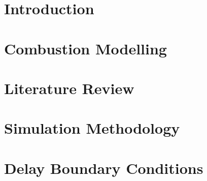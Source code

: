 \documentclass[lmr,second,hyperref,rgb,hyperref,dvipsnames]{uom_thesis_casson}
\title{\xmp@Title}
\author{\xmp@Author}
\begin{document}
\maketitle
\cleardoublepage

\vspace*{\fill}
\begin{center}

\end{center}
\cleardoublepage
\vspace*{\fill}


\setcounter{page}{5}
\cleardoublepage

\uomtoc
\cleardoublepage

\uomstartmainbody %

\chapter{Introduction} \label{ch:intro}

\cleardoublepage

\chapter{Combustion Modelling} \label{ch:combust-model}

\cleardoublepage

\chapter{Literature Review} \label{ch:lit-review}

\cleardoublepage

\chapter{Simulation Methodology} \label{ch:dns-methods}

\cleardoublepage

% 

\chapter{Delay Boundary Conditions} \label{ch:delay-bcs}

\cleardoublepage
\end{document}
